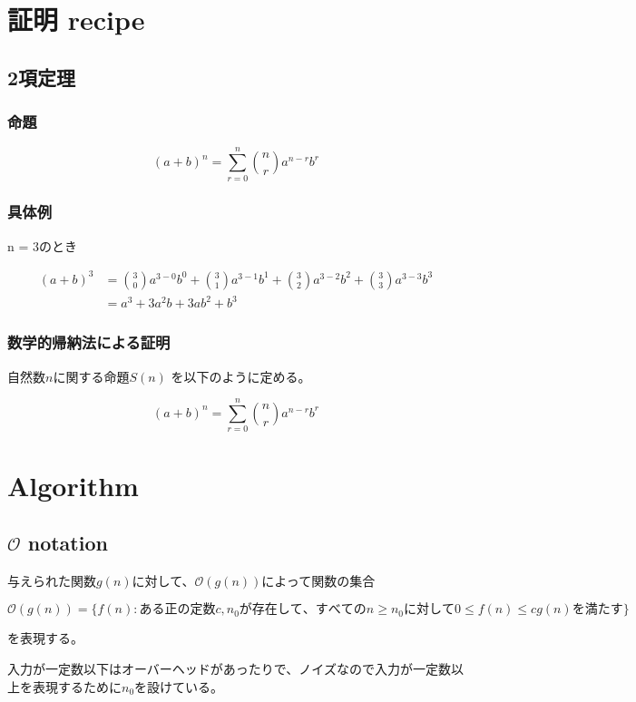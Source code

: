 \documentclass[dvipdfmx]{jsarticle}
\begin{document}
\section{証明 recipe}

\subsection{2項定理}

\subsubsection{命題}
\[ (a + b)^n = \sum_{r=0}^{n} \binom nr a^{n-r}b^r \]

\subsubsection{具体例}
n = 3のとき

\begin{align*}
  (a + b)^3 &= \binom {3}{0} a^{3-0}b^0 + \binom {3}{1} a^{3-1}b^1 + \binom {3}{2} a^{3-2}b^2 + \binom {3}{3} a^{3-3}b^3 \\
            &= a^3 + 3a^2b + 3ab^2 + b^3
\end{align*}

\subsubsection{数学的帰納法による証明}

$自然数nに関する命題S(n)$ を以下のように定める。

\[ (a + b)^n = \sum_{r=0}^{n} \binom nr a^{n-r}b^{r} \]

\section{Algorithm}

\subsection{$\mathcal{O}$ notation}

与えられた関数$g(n)$に対して、$\mathcal{O}(g(n))$によって関数の集合


\[ \mathcal{O}(g(n)) = \{ f(n): ある正の定数c, n_0が存在して、すべてのn \ge n_0に対して0 \le f(n) \le cg(n)を満たす\} \]


を表現する。

入力が一定数以下はオーバーヘッドがあったりで、ノイズなので入力が一定数以上を表現するために$n_0$を設けている。
\end{document}
